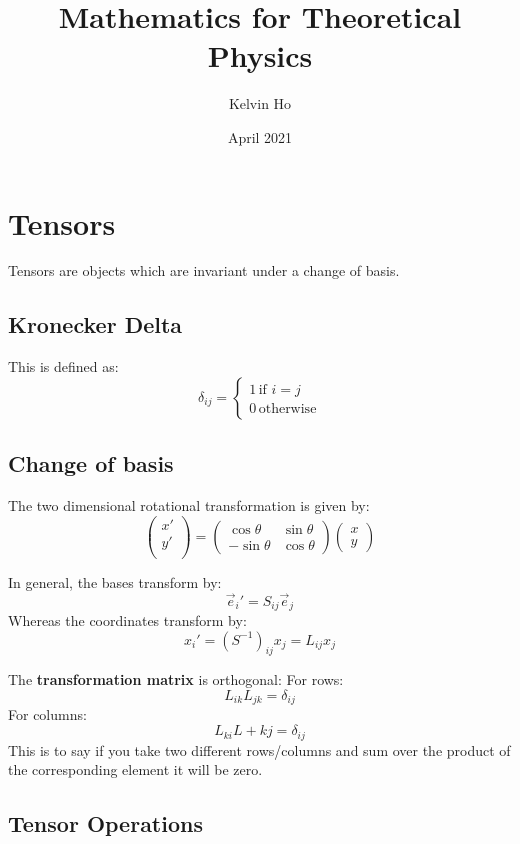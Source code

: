 \documentclass[12pt]{article}
\title{Mathematics for Theoretical Physics}
\author{Kelvin Ho}
\date{April 2021}
\begin{document}
\maketitle

\section{Tensors}

Tensors are objects which are invariant under a change of basis.

\subsection{Kronecker Delta}

This is defined as:
\[
\delta_{ij} = 
\begin{cases}
1 \, \text{if } i = j\\
0 \, \text{otherwise}
\end{cases}
\]

\subsection{Change of basis}
The two dimensional rotational transformation is given by:
\[
\begin{pmatrix}
x'\\
y'\\
\end{pmatrix} = 
\begin{pmatrix}
\cos\theta & \sin\theta\\
-\sin\theta & \cos\theta
\end{pmatrix}
\begin{pmatrix}
x\\y
\end{pmatrix}
\]


In general, the bases transform by:
\[ \vec{e}_i' = S_{ij}\vec{e}_j\]
Whereas the coordinates transform by:
\[ x_i' = (S^{-1})_{ij}x_j=L_{ij}x_j\]

The \textbf{transformation matrix} is orthogonal:
For rows:
\[ L_{ik}L_{jk} = \delta_{ij}\]
For columns:
\[ L_{ki}L+{kj} = \delta_{ij}\]
This is to say if you take two different rows/columns and sum over the product of the corresponding element it will be zero.

\subsection{Tensor Operations}
\end{document}
